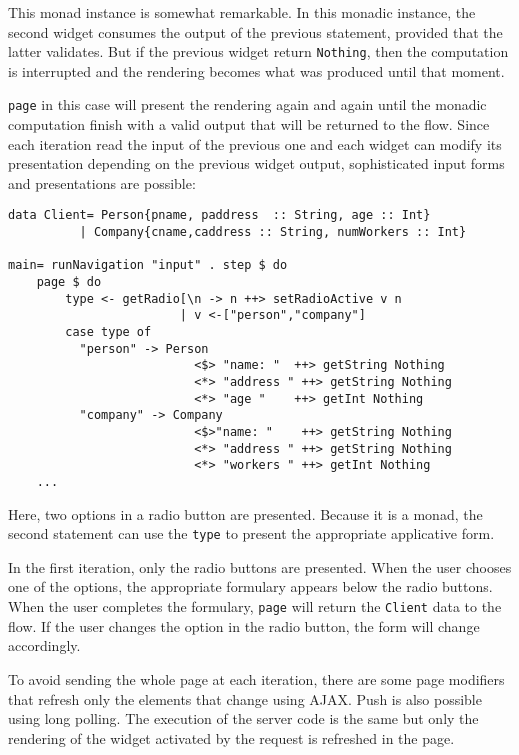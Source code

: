 \documentclass{tmr}
\begin{document}
This monad instance is somewhat remarkable. In this monadic instance, the second widget consumes the output of the previous statement, provided that the latter validates. But if the previous widget return {\tt Nothing}, then the computation is interrupted and the rendering becomes what was produced until that moment.
 
{\tt page} in this case will present the rendering again and again until the monadic computation finish with a valid output that will be returned to the flow. Since each iteration read the input of the previous one and each widget can modify its presentation depending on the previous widget output, sophisticated input forms and presentations are possible: 
{\tt 
 
\begin{verbatim} 
data Client= Person{pname, paddress  :: String, age :: Int} 
          | Company{cname,caddress :: String, numWorkers :: Int} 
 
main= runNavigation "input" . step $ do 
    page $ do 
        type <- getRadio[\n -> n ++> setRadioActive v n 
                        | v <-["person","company"] 
        case type of 
          "person" -> Person 
                          <$> "name: "  ++> getString Nothing 
                          <*> "address " ++> getString Nothing 
                          <*> "age "    ++> getInt Nothing 
          "company" -> Company 
                          <$>"name: "    ++> getString Nothing 
                          <*> "address " ++> getString Nothing 
                          <*> "workers " ++> getInt Nothing 
    ... 
\end{verbatim} 
 
} 
Here, two options in a radio button are presented. Because it is a  monad, the second statement can use the {\tt type} to present the  appropriate applicative form. 
 
In the first iteration, only the radio buttons are presented. When the user chooses one of the options, the appropriate formulary appears below the radio buttons. When the user completes the formulary, {\tt page} will return the {\tt Client} data to the flow. If the user changes the option in the radio button, the form will change accordingly. 
 
To avoid sending the whole page at each iteration, there are some page modifiers that refresh only the elements that change using AJAX\@. Push is also possible using long polling.  The execution of the server code is the same but only the rendering of the widget activated by the request is refreshed in the page.
 
\end{document}

